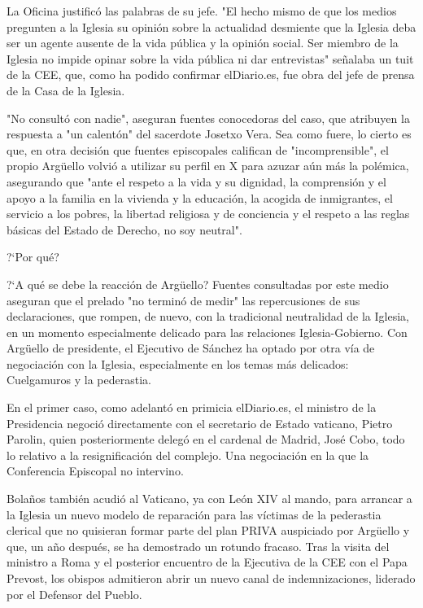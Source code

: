\documentclass[10pt,a4paper]{article}
\begin{document}
La Oficina justific\'{o} las palabras de su jefe. "El hecho mismo de que los medios pregunten a la Iglesia su opini\'{o}n sobre la actualidad desmiente que la Iglesia deba ser un agente ausente de la vida p\'{u}blica y la opini\'{o}n social. Ser miembro de la Iglesia no impide opinar sobre la vida p\'{u}blica ni dar entrevistas" se\~{n}alaba un tuit de la CEE, que, como ha podido confirmar elDiario.es, fue obra del jefe de prensa de la Casa de la Iglesia.
\par\medskip
"No consult\'{o} con nadie", aseguran fuentes conocedoras del caso, que atribuyen la respuesta a "un calent\'{o}n" del sacerdote Josetxo Vera. Sea como fuere, lo cierto es que, en otra decisi\'{o}n que fuentes episcopales califican de "incomprensible", el propio Arg\"{u}ello volvi\'{o} a utilizar su perfil en X para azuzar a\'{u}n m\'{a}s la pol\'{e}mica, asegurando que "ante el respeto a la vida y su dignidad, la comprensi\'{o}n y el apoyo a la familia en la vivienda y la educaci\'{o}n, la acogida de inmigrantes, el servicio a los pobres, la libertad religiosa y de conciencia y el respeto a las reglas b\'{a}sicas del Estado de Derecho, no soy neutral".
\par\medskip
?`Por qu\'{e}?
\par\medskip
?`A qu\'{e} se debe la reacci\'{o}n de Arg\"{u}ello? Fuentes consultadas por este medio aseguran que el prelado "no termin\'{o} de medir" las repercusiones de sus declaraciones, que rompen, de nuevo, con la tradicional neutralidad de la Iglesia, en un momento especialmente delicado para las relaciones Iglesia-Gobierno. Con Arg\"{u}ello de presidente, el Ejecutivo de S\'{a}nchez ha optado por otra v\'{i}a de negociaci\'{o}n con la Iglesia, especialmente en los temas m\'{a}s delicados: Cuelgamuros y la pederastia.
\par\medskip
En el primer caso, como adelant\'{o} en primicia elDiario.es, el ministro de la Presidencia negoci\'{o} directamente con el secretario de Estado vaticano, Pietro Parolin, quien posteriormente deleg\'{o} en el cardenal de Madrid, Jos\'{e} Cobo, todo lo relativo a la resignificaci\'{o}n del complejo. Una negociaci\'{o}n en la que la Conferencia Episcopal no intervino.
\par\medskip
Bola\~{n}os tambi\'{e}n acudi\'{o} al Vaticano, ya con Le\'{o}n XIV al mando, para arrancar a la Iglesia un nuevo modelo de reparaci\'{o}n para las v\'{i}ctimas de la pederastia clerical que no quisieran formar parte del plan PRIVA auspiciado por Arg\"{u}ello y que, un a\~{n}o despu\'{e}s, se ha demostrado un rotundo fracaso. Tras la visita del ministro a Roma y el posterior encuentro de la Ejecutiva de la CEE con el Papa Prevost, los obispos admitieron abrir un nuevo canal de indemnizaciones, liderado por el Defensor del Pueblo.
\end{document}
